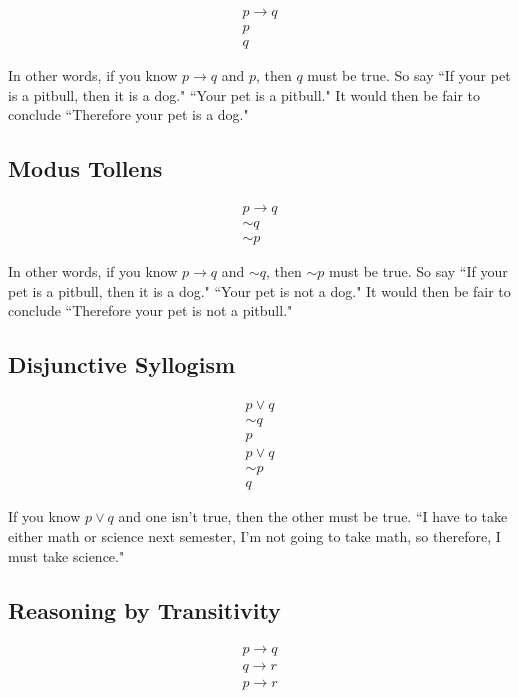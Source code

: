 $$\begin{array}{l}
p\to q \\
p\\
\hline
q
\end{array}$$

In other words, if you know $p\to q$ and $p$, then $q$ must be true.  So say ``If your pet is a pitbull, then it is a dog."  ``Your pet is a pitbull."  It would then be fair to conclude ``Therefore your pet is a dog."




\subsection{Modus Tollens}

$$\begin{array}{l}
p\to q \\
\sim q\\
\hline
\sim p
\end{array}$$

In other words, if you know $p\to q$ and $\sim q$, then $\sim p$ must be true.  So say ``If your pet is a pitbull, then it is a dog."  ``Your pet is not a dog."  It would then be fair to conclude ``Therefore your pet is not a pitbull."


\subsection{Disjunctive Syllogism}



$$\begin{array}{l}
p\vee q \\
\sim q\\
\hline
p
\end{array}$$
$$\begin{array}{l}
p\vee q \\
\sim p\\
\hline
q
\end{array}$$


If you know $p \vee q$ and one isn't true, then the other must be true.  ``I have to take either math or science next semester, I'm not going to take math, so therefore, I must take science."

\subsection{Reasoning by Transitivity}

$$\begin{array}{l}
p\to q \\
q\to r\\
\hline
p\to r
\end{array}$$

